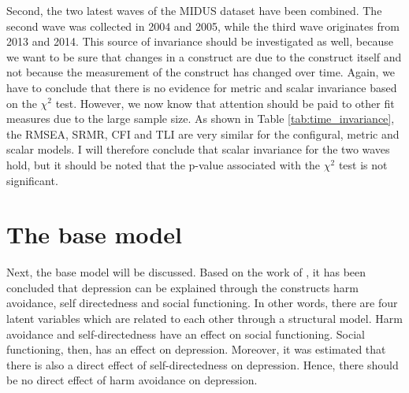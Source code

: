 \documentclass[11pt]{article}
\begin{document}
\begin{table}[h]
\captionsetup{singlelinecheck=off}
\caption{Time measurement invariance}
\label{tab:time_invariance}
\end{table}

Second, the two latest waves of the MIDUS dataset have been combined. The second
wave was collected in 2004 and 2005, while the third wave originates from 2013
and 2014. This source of invariance should be investigated as well, because we
want to be sure that changes in a construct are due to the construct itself and
not because the measurement of the construct has changed over time. Again, we
have to conclude that there is no evidence for metric and scalar invariance based
on the $\chi^2$ test. However, we now know that attention should be paid to other
fit measures due to the large sample size. As shown in Table \ref{tab:time_invariance},
the RMSEA, SRMR, CFI and TLI are very similar for the configural, metric and
scalar models. I will therefore conclude that scalar invariance for the two waves
hold, but it should be noted that the p-value associated with the $\chi^2$ test
is not significant.

\FloatBarrier
\pagebreak
\section{The base model}

Next, the base model will be discussed. Based on the work of \textcite{tse2011},
it has been concluded that depression can be explained through the constructs
harm avoidance, self directedness and social functioning. In other words, there
are four latent variables which are related to each other through a structural
model. Harm avoidance and self-directedness have an effect on social functioning.
Social functioning, then, has an effect on depression. Moreover, it was estimated
that there is also a direct effect of self-directedness on depression.
Hence, there should be no direct effect of harm avoidance on depression.
\end{document}
